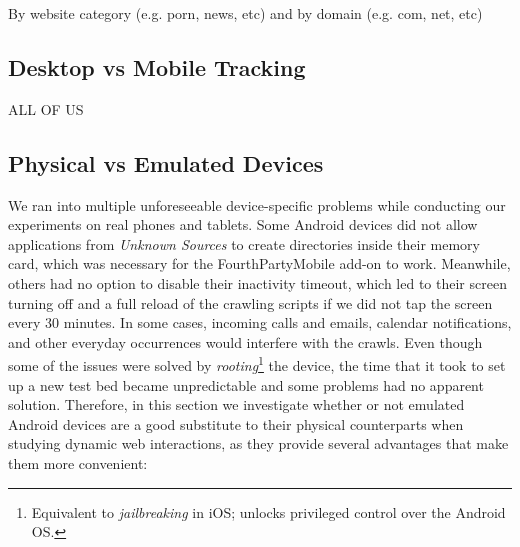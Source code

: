 \documentclass{acm_proc_article-sp}
\begin{document}
By website category (e.g. porn, news, etc) and by domain (e.g. com, net, etc)

\subsection{Desktop vs Mobile Tracking}
ALL OF US

\subsection{Physical vs Emulated Devices}

We ran into multiple unforeseeable device-specific problems while conducting our experiments on real phones and tablets. Some Android devices did not allow applications from \emph{Unknown Sources} to create directories inside their memory card, which was necessary for the FourthPartyMobile add-on to work. Meanwhile, others had no option to disable their inactivity timeout, which led to their screen turning off and a full reload of the crawling scripts if we did not tap the screen every 30 minutes. In some cases, incoming calls and emails, calendar notifications, and other everyday occurrences would interfere with the crawls. Even though some of the issues were solved by \emph{rooting}\footnote{Equivalent to \emph{jailbreaking} in iOS; unlocks privileged control over the Android OS.} the device, the time that it took to set up a new test bed became unpredictable and some problems had no apparent solution. Therefore, in this section we investigate whether or not emulated Android devices are a good substitute to their physical counterparts when studying dynamic web interactions, as they provide several advantages that make them more convenient:
\end{document}
